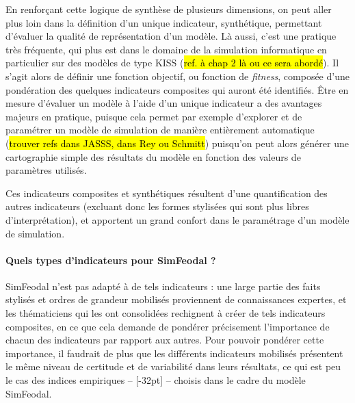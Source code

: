 En renforçant cette logique de synthèse de plusieurs dimensions, on peut aller plus loin dans la définition d'un unique indicateur, synthétique, permettant d'évaluer la qualité de représentation d'un modèle.
Là aussi, c'est une pratique très fréquente, qui plus est dans le domaine de la simulation informatique en particulier sur des modèles de type \og KISS\fg{} (\hl{ref. à chap 2 là ou ce sera abordé}).
Il s'agit alors de définir une \og fonction objectif\fg{}, ou \og fonction de \textit{fitness}\fg{}, composée d'une pondération des quelques indicateurs composites qui auront été identifiés.
Être en mesure d'évaluer un modèle à l'aide d'un unique indicateur a des avantages majeurs en pratique, puisque cela permet par exemple d'explorer et de paramétrer un modèle de simulation de manière entièrement automatique (\hl{trouver refs dans JASSS, dans Rey ou Schmitt}) puisqu'on peut alors générer une cartographie simple des résultats du modèle en fonction des valeurs de paramètres utilisés.

Ces indicateurs composites et synthétiques résultent d'une quantification des autres indicateurs (excluant donc les formes stylisées qui sont plus libres d'interprétation), et apportent un grand confort dans le paramétrage d'un modèle de simulation.

\paragraph{Quels types d'indicateurs pour SimFeodal ?}\label{par:indicateurs-simfeodal}

SimFeodal n'est pas adapté à de tels indicateurs :
une large partie des faits stylisés et ordres de grandeur mobilisés proviennent de connaissances expertes, et les thématiciens qui les ont consolidées rechignent à créer de tels indicateurs composites, en ce que cela demande de pondérer précisement l'importance de chacun des indicateurs par rapport aux autres.
Pour pouvoir pondérer cette importance, il faudrait de plus que les différents indicateurs mobilisés présentent le même niveau de certitude et de variabilité dans leurs résultats, ce qui est peu le cas des indices empiriques -- [-32pt] -- choisis dans le cadre du modèle SimFeodal.

